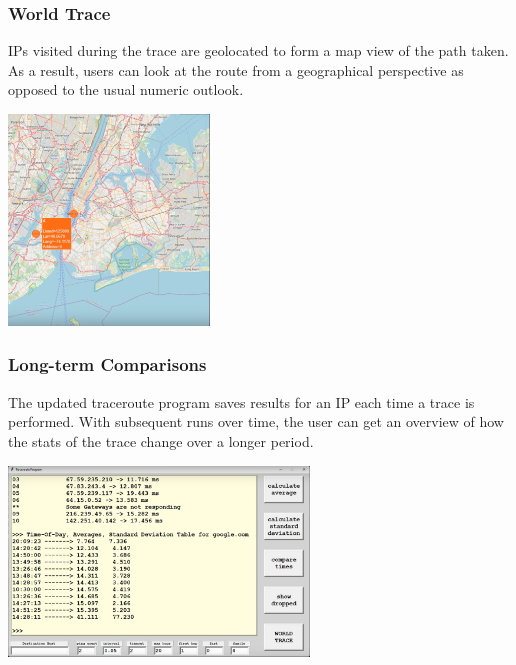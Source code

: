\documentclass{beamer}
\begin{document}
\begin{frame}
\frametitle{World Trace}

IPs visited during the trace are geolocated to form a map view of the 
path taken. As a result, users can look at the route from a geographical
perspective as opposed to the usual numeric outlook.

\begin{center}
\includegraphics[width=0.4\textwidth]{media/worldtrace.png}
\end{center}

\end{frame}

\begin{frame}
\frametitle{Long-term Comparisons}

The updated traceroute program saves results for an IP each time a trace is performed.
With subsequent runs over time, the user can get an overview of how the stats of the 
trace change over a longer period.


\begin{center}
\includegraphics[width=0.6\textwidth]{media/compare.png}
\end{center}
\end{frame}
\end{document}
